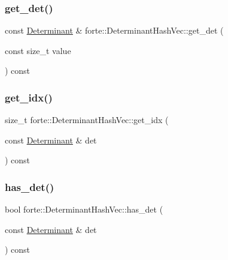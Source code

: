 \subsubsection{\texorpdfstring{get\+\_\+det()}{get\_det()}}
{\footnotesize\ttfamily const \mbox{\hyperlink{namespaceforte_a2076c63fd7b8732004d9e1442ce527c1}{Determinant}} \& forte\+::\+Determinant\+Hash\+Vec\+::get\+\_\+det (\begin{DoxyParamCaption}\item[{const size\+\_\+t}]{value }\end{DoxyParamCaption}) const}

\mbox{\label{classforte_1_1_determinant_hash_vec_a1547252a5e500ecb773d5ddac0368d1e}} 
\subsubsection{\texorpdfstring{get\+\_\+idx()}{get\_idx()}}
{\footnotesize\ttfamily size\+\_\+t forte\+::\+Determinant\+Hash\+Vec\+::get\+\_\+idx (\begin{DoxyParamCaption}\item[{const \mbox{\hyperlink{namespaceforte_a2076c63fd7b8732004d9e1442ce527c1}{Determinant}} \&}]{det }\end{DoxyParamCaption}) const}

\mbox{\label{classforte_1_1_determinant_hash_vec_a683b6f9a2be21955d7caa0181cf88f77}} 
\subsubsection{\texorpdfstring{has\+\_\+det()}{has\_det()}}
{\footnotesize\ttfamily bool forte\+::\+Determinant\+Hash\+Vec\+::has\+\_\+det (\begin{DoxyParamCaption}\item[{const \mbox{\hyperlink{namespaceforte_a2076c63fd7b8732004d9e1442ce527c1}{Determinant}} \&}]{det }\end{DoxyParamCaption}) const}


